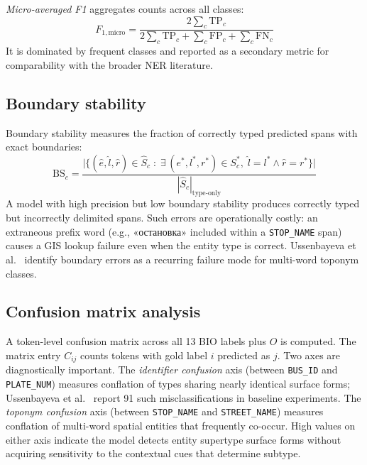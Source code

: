 \textit{Micro-averaged F1} aggregates counts across all classes:
\begin{equation}
  F_{1,\text{micro}} = \frac{2 \displaystyle\sum_{c} \mathrm{TP}_c}{2\displaystyle\sum_{c} \mathrm{TP}_c + \displaystyle\sum_{c} \mathrm{FP}_c + \displaystyle\sum_{c} \mathrm{FN}_c}
  \label{eq:micro_f1}
\end{equation}
It is dominated by frequent classes and reported as a secondary metric for comparability with the broader NER literature.

\subsection{Boundary stability}
\label{sec:boundary_stability}

Boundary stability measures the fraction of correctly typed predicted spans with exact boundaries:
\begin{equation}
  \mathrm{BS}_c = \frac{\bigl|\bigl\{(\hat{e},\hat{l},\hat{r}) \in \hat{S}_c \;:\; \exists\,(e^*,l^*,r^*) \in S^*_c,\; \hat{l} = l^* \wedge \hat{r} = r^*\bigr\}\bigr|}{|\hat{S}_c|_{\text{type-only}}}
  \label{eq:bs}
\end{equation}
A model with high precision but low boundary stability produces correctly typed but incorrectly delimited spans. Such errors are operationally costly: an extraneous prefix word (e.g., \foreignlanguage{russian}{«остановка»} included within a \texttt{STOP\_NAME} span) causes a GIS lookup failure even when the entity type is correct. Ussenbayeva et al.~\cite{ussenbayeva2026heterogeneous} identify boundary errors as a recurring failure mode for multi-word toponym classes.

\subsection{Confusion matrix analysis}
\label{sec:confusion_matrix}

A token-level confusion matrix across all 13 BIO labels plus $O$ is computed. The matrix entry $C_{ij}$ counts tokens with gold label $i$ predicted as $j$. Two axes are diagnostically important. The \textit{identifier confusion} axis (between \texttt{BUS\_ID} and \texttt{PLATE\_NUM}) measures conflation of types sharing nearly identical surface forms; Ussenbayeva et al.~\cite{ussenbayeva2026heterogeneous} report 91 such misclassifications in baseline experiments. The \textit{toponym confusion} axis (between \texttt{STOP\_NAME} and \texttt{STREET\_NAME}) measures conflation of multi-word spatial entities that frequently co-occur. High values on either axis indicate the model detects entity supertype surface forms without acquiring sensitivity to the contextual cues that determine subtype.

